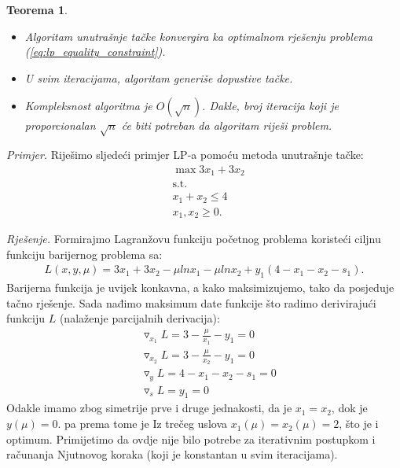 \documentclass[a4paper, utf8, 11pt, colorlinks]{article}
\newtheorem{thm}{Teorema}
\begin{document}
\begin{thm}
	\begin{itemize}
		\item Algoritam unutrašnje tačke konvergira ka optimalnom rješenju problema (\ref{eq:lp_equality_constraint}). %
		\item U svim iteracijama, algoritam generiše dopustive tačke.
		\item Kompleksnost algoritma je $O(\sqrt{n})$. Dakle,  broj iteracija koji je proporcionalan $\sqrt{n}$ će biti potreban da algoritam riješi problem. 
	\end{itemize}
\end{thm}
\emph{Primjer.} Riješimo sljedeći primjer LP-a pomoću metoda unutrašnje tačke:
\begin{align*}
	&\max 3 x_1 + 3 x_2 \\
	&\mbox{s.t.} \\
	& x_1 + x_2 \leq 4 \\
	& x_1, x_2 \geq 0.
\end{align*}

\emph{Rješenje.}  Formirajmo Lagranžovu funkciju početnog problema koristeći ciljnu funkciju barijernog problema sa:  
\begin{align*}
   L(x, y, \mu) = 	  3 x_1 + 3 x_2 -\mu ln x_1 - \mu ln x_2 + y_1(4- x_1 - x_2 - s_1).  
\end{align*}
Barijerna funkcija je uvijek konkavna, a kako maksimizujemo,  tako da posjeduje tačno rješenje.  Sada nađimo maksimum date funkcije što radimo derivirajući funkciju $L$ (nalaženje parcijalnih derivacija):
\begin{align*}
	 &\triangledown_{x_1} L   =  3 - \frac{\mu}{x_1}  - y_1 = 0 \\
	 &\triangledown_{x_2} L   =  3 - \frac{\mu}{x_2} - y_1 = 0 \\
	 &\triangledown_{y} L   = {4-x_1-x_2 - s_1} = 0 \\
	 &\triangledown_{s} L   = { y_1} = 0 
\end{align*}
Odakle imamo zbog simetrije prve i druge jednakosti, da je  $x_1 = x_2$, dok je $y(\mu) = 0$. pa prema tome je 
Iz trečeg uslova   $x_1(\mu)=x_2(\mu)=2$, što je i optimum. Primijetimo da ovdje nije bilo potrebe za iterativnim postupkom i računanja Njutnovog koraka (koji je konstantan u svim iteracijama). 
\newpage
\end{document}
